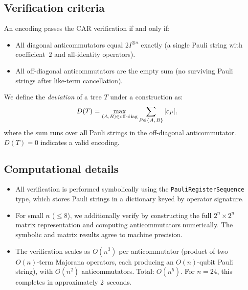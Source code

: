 \subsection*{Verification criteria}

An encoding passes the CAR verification if and only if:
\begin{itemize}
  \item All diagonal anticommutators equal $2I^{\otimes n}$ exactly
    (a single Pauli string with coefficient~$2$ and all-identity
    operators).
  \item All off-diagonal anticommutators are the empty sum (no
    surviving Pauli strings after like-term cancellation).
\end{itemize}

We define the \emph{deviation} of a tree $T$ under a construction as:
\begin{equation}
  D(T) = \max_{(A,B) \in \text{off-diag}}
    \sum_{P \in \{A,\,B\}} |c_P|,
\end{equation}
where the sum runs over all Pauli strings in the off-diagonal
anticommutator.  $D(T) = 0$ indicates a valid encoding.

\subsection*{Computational details}

\begin{itemize}
  \item All verification is performed symbolically using the
    \texttt{PauliRegisterSequence} type, which stores Pauli strings
    in a dictionary keyed by operator signature.
  \item For small $n$ ($\le 8$), we additionally verify by
    constructing the full $2^n \times 2^n$ matrix representation
    and computing anticommutators numerically.  The symbolic and
    matrix results agree to machine precision.
  \item The verification scales as $O(n^3)$ per anticommutator
    (product of two $O(n)$-term Majorana operators, each producing
    an $O(n)$-qubit Pauli string), with $O(n^2)$
    anticommutators.  Total: $O(n^5)$.  For $n = 24$, this completes
    in approximately 2~seconds.
\end{itemize}

